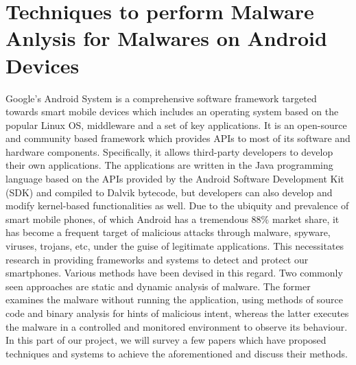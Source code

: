 \documentclass[11pt]{article}
\begin{document}
	
	\section{Techniques to perform Malware Anlysis for Malwares on Android Devices}
	Google’s Android System is a comprehensive software framework targeted towards smart mobile devices which includes an operating system based on the popular Linux OS, middleware and a set of key applications. It is an open-source and community based framework which provides APIs to most of its software and hardware components. Specifically, it allows third-party developers to develop their own applications. The applications are written in the Java programming language based on the APIs provided by the Android Software Development Kit (SDK) and compiled to Dalvik bytecode, but developers can also develop and modify kernel-based functionalities as well.
	Due to the ubiquity and prevalence of smart mobile phones, of which Android has a tremendous 88\% market share, it has become a frequent target of malicious attacks through malware, spyware, viruses, trojans, etc, under the guise of legitimate applications. This necessitates research in providing frameworks and systems to detect and protect our smartphones.
	Various methods have been devised in this regard. Two commonly seen approaches are static and dynamic analysis of malware. The former examines the malware without running the application, using methods of source code and binary analysis for hints of malicious intent, whereas the latter executes the malware in a controlled and monitored environment to observe its behaviour. In this part of our project, we will survey a few papers which have proposed techniques and systems to achieve the aforementioned and discuss their methods. 
	
\end{document}
